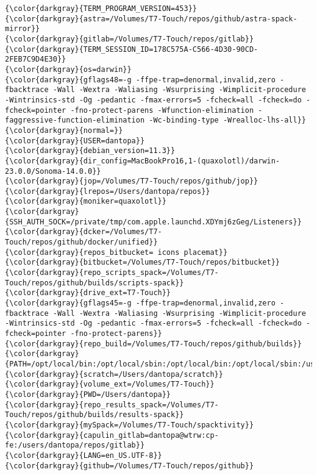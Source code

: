 {{\begin{Verbatim}[commandchars=\\\{\}]
{\color{darkgray}{TERM_PROGRAM_VERSION=453}}
{\color{darkgray}{astra=/Volumes/T7-Touch/repos/github/astra-spack-mirror}}
{\color{darkgray}{gitlab=/Volumes/T7-Touch/repos/gitlab}}
{\color{darkgray}{TERM_SESSION_ID=178C575A-C566-4D30-90CD-2FEB7C9D4E30}}
{\color{darkgray}{os=darwin}}
{\color{darkgray}{gflags48=-g -ffpe-trap=denormal,invalid,zero -fbacktrace -Wall -Wextra -Waliasing -Wsurprising -Wimplicit-procedure -Wintrinsics-std -Og -pedantic -fmax-errors=5 -fcheck=all -fcheck=do -fcheck=pointer -fno-protect-parens -Wfunction-elimination -faggressive-function-elimination -Wc-binding-type -Wrealloc-lhs-all}}
{\color{darkgray}{normal=}}
{\color{darkgray}{USER=dantopa}}
{\color{darkgray}{debian_version=11.3}}
{\color{darkgray}{dir_config=MacBookPro16,1-(quaxolotl)/darwin-23.0.0/Sonoma-14.0.0}}
{\color{darkgray}{jop=/Volumes/T7-Touch/repos/github/jop}}
{\color{darkgray}{lrepos=/Users/dantopa/repos}}
{\color{darkgray}{moniker=quaxolotl}}
{\color{darkgray}{SSH_AUTH_SOCK=/private/tmp/com.apple.launchd.XDYmj6zGeg/Listeners}}
{\color{darkgray}{dcker=/Volumes/T7-Touch/repos/github/docker/unified}}
{\color{darkgray}{repos_bitbucket= icons placemat}}
{\color{darkgray}{bitbucket=/Volumes/T7-Touch/repos/bitbucket}}
{\color{darkgray}{repo_scripts_spack=/Volumes/T7-Touch/repos/github/builds/scripts-spack}}
{\color{darkgray}{drive_ext=T7-Touch}}
{\color{darkgray}{gflags45=-g -ffpe-trap=denormal,invalid,zero -fbacktrace -Wall -Wextra -Waliasing -Wsurprising -Wimplicit-procedure -Wintrinsics-std -Og -pedantic -fmax-errors=5 -fcheck=all -fcheck=do -fcheck=pointer -fno-protect-parens}}
{\color{darkgray}{repo_build=/Volumes/T7-Touch/repos/github/builds}}
{\color{darkgray}{PATH=/opt/local/bin:/opt/local/sbin:/opt/local/bin:/opt/local/sbin:/usr/local/bin:/System/Cryptexes/App/usr/bin:/usr/bin:/bin:/usr/sbin:/sbin:/var/run/com.apple.security.cryptexd/codex.system/bootstrap/usr/local/bin:/var/run/com.apple.security.cryptexd/codex.system/bootstrap/usr/bin:/var/run/com.apple.security.cryptexd/codex.system/bootstrap/usr/appleinternal/bin:/opt/X11/bin:/Library/Apple/usr/bin:/Library/TeX/texbin:/opt/podman/bin:/Users/dantopa/.cabal/bin:/Users/dantopa/.ghcup/bin}}
{\color{darkgray}{scratch=/Users/dantopa/scratch}}
{\color{darkgray}{volume_ext=/Volumes/T7-Touch}}
{\color{darkgray}{PWD=/Users/dantopa}}
{\color{darkgray}{repo_results_spack=/Volumes/T7-Touch/repos/github/builds/results-spack}}
{\color{darkgray}{mySpack=/Volumes/T7-Touch/spacktivity}}
{\color{darkgray}{capulin_gitlab=dantopa@wtrw:cp-fe:/users/dantopa/repos/gitlab}}
{\color{darkgray}{LANG=en_US.UTF-8}}
{\color{darkgray}{github=/Volumes/T7-Touch/repos/github}}

\end{Verbatim}}}
